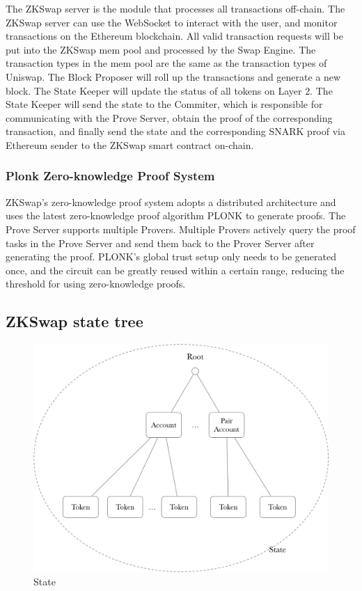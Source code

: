 \documentclass[]{template/llncs}
\begin{document}
The ZKSwap server is the module that processes all transactions off-chain. The ZKSwap server can use the WebSocket to interact with the user, and monitor transactions on the Ethereum blockchain. All valid transaction requests will be put into the ZKSwap mem pool and processed by the Swap Engine. The transaction types in the mem pool are the same as the transaction types of Uniswap. 
The Block Proposer will roll up the transactions and generate a new block. The State Keeper will update the status of all tokens on Layer 2. The State Keeper will send the state to the Commiter, which is responsible for communicating with the Prove Server, obtain the proof of the corresponding transaction, and finally send the state and the corresponding SNARK proof via Ethereum sender to the ZKSwap smart contract on-chain.


\subsubsection{Plonk Zero-knowledge Proof System}

ZKSwap's zero-knowledge proof system adopts a distributed architecture and uses the latest zero-knowledge proof algorithm PLONK\cite{cryptoeprint:2019:953} to generate proofs. The Prove Server supports multiple Provers. Multiple Provers actively query the proof tasks in the Prove Server and send them back to the Prover Server after generating the proof. PLONK's global trust setup only needs to be generated once, and the circuit can be greatly reused within a certain range, reducing the threshold for using zero-knowledge proofs.

\subsection{ZKSwap state tree}

\begin{figure}[htbp]
\centering
\includegraphics[width=0.9\columnwidth]{figure/state}
\caption{State}
\label{fig:state}
\end{figure}
\end{document}
